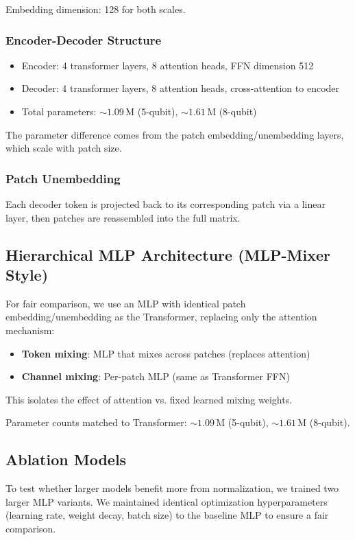 \documentclass[11pt]{article}
\begin{document}
Embedding dimension: 128 for both scales.

\subsubsection{Encoder-Decoder Structure}
\label{sec:orgf3e0172}

\begin{itemize}
\item Encoder: 4 transformer layers, 8 attention heads, FFN dimension 512
\item Decoder: 4 transformer layers, 8 attention heads, cross-attention to encoder
\item Total parameters: \(\sim 1.09\,\mathrm{M}\) (5-qubit), \(\sim 1.61\,\mathrm{M}\) (8-qubit)
\end{itemize}

The parameter difference comes from the patch embedding/unembedding layers, which scale with patch size.

\subsubsection{Patch Unembedding}
\label{sec:org1862a09}

Each decoder token is projected back to its corresponding patch via a linear layer, then patches are reassembled into the full matrix.

\subsection{Hierarchical MLP Architecture (MLP-Mixer Style)}
\label{sec:orga171994}

For fair comparison, we use an MLP with identical patch embedding/unembedding as the Transformer, replacing only the attention mechanism:

\begin{itemize}
\item \textbf{Token mixing}: MLP that mixes across patches (replaces attention)
\item \textbf{Channel mixing}: Per-patch MLP (same as Transformer FFN)
\end{itemize}

This isolates the effect of attention vs. fixed learned mixing weights.

Parameter counts matched to Transformer: \(\sim 1.09\,\mathrm{M}\) (5-qubit), \(\sim 1.61\,\mathrm{M}\) (8-qubit).

\subsection{Ablation Models}
\label{sec:org6f57019}
To test whether larger models benefit more from normalization, we trained two larger MLP variants. We maintained identical optimization hyperparameters (learning rate, weight decay, batch size) to the baseline MLP to ensure a fair comparison.
\end{document}
